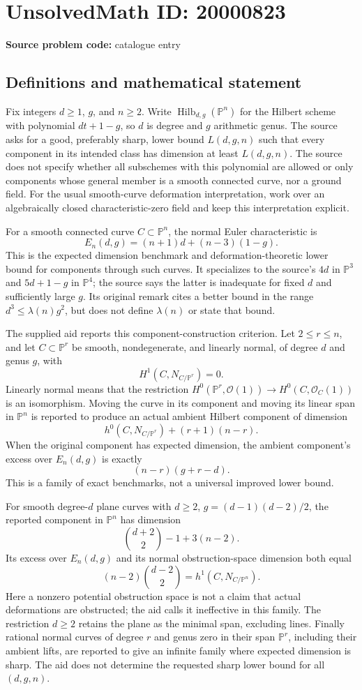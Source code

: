 \documentclass[11pt]{article}
\newcommand{\PP}{\mathbb{P}}
\begin{document}
\section*{UnsolvedMath ID: 20000823}
\textbf{Source problem code:} catalogue entry
\subsection{Definitions and mathematical statement}
Fix integers \(d\ge1\), \(g\), and \(n\ge2\). Write \(\operatorname{Hilb}_{d,g}(\PP^n)\) for the Hilbert scheme with polynomial \(dt+1-g\), so \(d\) is degree and \(g\) arithmetic genus. The source asks for a good, preferably sharp, lower bound \(L(d,g,n)\) such that every component in its intended class has dimension at least \(L(d,g,n)\). The source does not specify whether all subschemes with this polynomial are allowed or only components whose general member is a smooth connected curve, nor a ground field. For the usual smooth-curve deformation interpretation, work over an algebraically closed characteristic-zero field and keep this interpretation explicit.

For a smooth connected curve \(C\subset\PP^n\), the normal Euler characteristic is
\[
 E_n(d,g)=(n+1)d+(n-3)(1-g).
\]
This is the expected dimension benchmark and deformation-theoretic lower bound for components through such curves. It specializes to the source's \(4d\) in \(\PP^3\) and \(5d+1-g\) in \(\PP^4\); the source says the latter is inadequate for fixed \(d\) and sufficiently large \(g\). Its original remark cites a better bound in the range \(d^3\le\lambda(n)g^2\), but does not define \(\lambda(n)\) or state that bound.

The supplied aid reports this component-construction criterion. Let \(2\le r\le n\), and let \(C\subset\PP^r\) be smooth, nondegenerate, and linearly normal, of degree \(d\) and genus \(g\), with
\[
 H^1(C,N_{C/\PP^r})=0.
\]
Linearly normal means that the restriction \(H^0(\PP^r,\mathcal O(1))\to H^0(C,\mathcal O_C(1))\) is an isomorphism. Moving the curve in its component and moving its linear span in \(\PP^n\) is reported to produce an actual ambient Hilbert component of dimension
\[
 h^0(C,N_{C/\PP^r})+(r+1)(n-r).
\]
When the original component has expected dimension, the ambient component's excess over \(E_n(d,g)\) is exactly
\[
 (n-r)(g+r-d).
\]
This is a family of exact benchmarks, not a universal improved lower bound.

For smooth degree-\(d\) plane curves with \(d\ge2\), \(g=(d-1)(d-2)/2\), the reported component in \(\PP^n\) has dimension
\[
 \binom{d+2}{2}-1+3(n-2).
\]
Its excess over \(E_n(d,g)\) and its normal obstruction-space dimension both equal
\[
 (n-2)\binom{d-2}{2}=h^1(C,N_{C/\PP^n}).
\]
Here a nonzero potential obstruction space is not a claim that actual deformations are obstructed; the aid calls it ineffective in this family. The restriction \(d\ge2\) retains the plane as the minimal span, excluding lines. Finally rational normal curves of degree \(r\) and genus zero in their span \(\PP^r\), including their ambient lifts, are reported to give an infinite family where expected dimension is sharp. The aid does not determine the requested sharp lower bound for all \((d,g,n)\).
\end{document}
